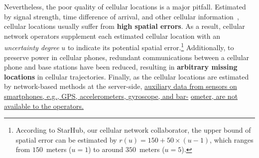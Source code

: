 \documentclass{vldb}
\begin{document}
	Nevertheless, the poor quality of cellular locations is a major pitfall. Estimated by signal strength, time difference of arrival, and other cellular information~\cite{cong2002hybrid}, cellular locations usually suffer from \textbf{high spatial errors}. As a result, cellular network operators supplement each estimated cellular location with an {\em uncertainty degree} $u$ to indicate its potential spatial error.\footnote{\label{fn:uncertainty-degree} According to StarHub, our cellular network collaborator, the upper bound of spatial error can be estimated by $r(u)=150+50\times(u-1)$, which ranges from $150$~meters ($u=1$) to around $350$~meters ($u=5$).} Additionally, to preserve power in cellular phones, redundant communications between a cellular phone and base stations have been reduced, resulting in \textbf{arbitrary missing locations} in cellular trajectories. Finally, as the cellular locations are estimated by network-based methods at the server-side,  \underline{auxiliary data from sensors on} \underline{smartphones, e.g., GPS, accelerometers, gyroscope, and bar-} \underline{ometer, are not available to the operators.} 
	
	
\end{document}
